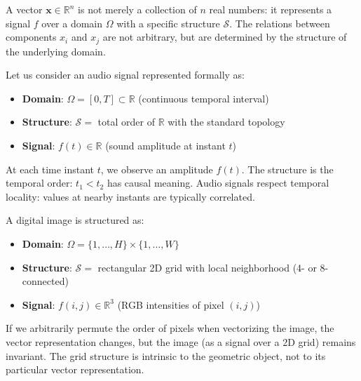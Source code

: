 A vector $\mathbf{x} \in \mathbb{R}^n$ is not merely a collection of $n$ real numbers: it represents a signal $f$ over a domain $\Omega$ with a specific structure $\mathcal{S}$. The relations between components $x_i$ and $x_j$ are not arbitrary, but are determined by the structure of the underlying domain.

\begin{example}\label{ex:senal_audio}
Let us consider an audio signal represented formally as:
\begin{itemize}
	\item \textbf{Domain}: $\Omega = [0, T] \subset \mathbb{R}$ (continuous temporal interval)
	\item \textbf{Structure}: $\mathcal{S} = $ total order of $\mathbb{R}$ with the standard topology
	\item \textbf{Signal}: $f(t) \in \mathbb{R}$ (sound amplitude at instant $t$)
\end{itemize}

At each time instant $t$, we observe an amplitude $f(t)$. The structure is the temporal order: $t_1 < t_2$ has causal meaning. Audio signals respect temporal locality: values at nearby instants are typically correlated.
\end{example}

\begin{example}\label{ex:imagen_grilla}
A digital image is structured as:
\begin{itemize}
	\item \textbf{Domain}: $\Omega = \{1,\ldots,H\} \times \{1,\ldots,W\}$
	\item \textbf{Structure}: $\mathcal{S} = $ rectangular 2D grid with local neighborhood (4- or 8-connected)
	\item \textbf{Signal}: $f(i,j) \in \mathbb{R}^3$ (RGB intensities of pixel $(i,j)$)
\end{itemize}

If we arbitrarily permute the order of pixels when vectorizing the image, the vector representation changes, but the image (as a signal over a 2D grid) remains invariant. The grid structure is intrinsic to the geometric object, not to its particular vector representation.
\end{example}

